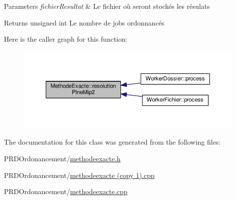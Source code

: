 \begin{DoxyParams}{Parameters}
{\em fichier\+Resultat} & Le fichier où seront stockés les résulats \\
\hline
\end{DoxyParams}
\begin{DoxyReturn}{Returns}
unsigned int Le nombre de jobs ordonnancés 
\end{DoxyReturn}
Here is the caller graph for this function\+:\nopagebreak
\begin{figure}[H]
\begin{center}
\leavevmode
\includegraphics[width=350pt]{classMethodeExacte_a3163e487cc9e99ee7667d1dd146edb4b_icgraph}
\end{center}
\end{figure}


The documentation for this class was generated from the following files\+:\begin{DoxyCompactItemize}
\item 
P\+R\+D\+Ordonancement/\hyperlink{methodeexacte_8h}{methodeexacte.\+h}\item 
P\+R\+D\+Ordonancement/\hyperlink{methodeexacte_01_07copy_011_08_8cpp}{methodeexacte (copy 1).\+cpp}\item 
P\+R\+D\+Ordonancement/\hyperlink{methodeexacte_8cpp}{methodeexacte.\+cpp}\end{DoxyCompactItemize}
